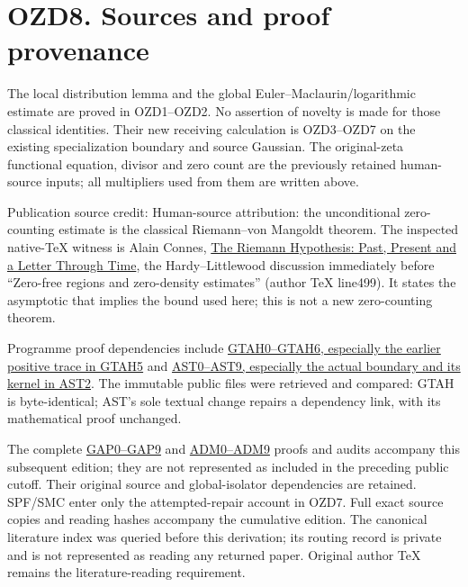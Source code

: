 \section{OZD8. Sources and proof
provenance}\label{ozd8.-sources-and-proof-provenance}

The local distribution lemma and the global Euler--Maclaurin/logarithmic
estimate are proved in OZD1--OZD2. No assertion of novelty is made for
those classical identities. Their new receiving calculation is
OZD3--OZD7 on the existing specialization boundary and source Gaussian.
The original-zeta functional equation, divisor and zero count are the
previously retained human-source inputs; all multipliers used from them
are written above.

Publication source credit: Human-source attribution: the unconditional
zero-counting estimate is the classical Riemann--von Mangoldt theorem.
The inspected native-TeX witness is Alain Connes,
\href{https://arxiv.org/abs/2602.04022v1}{The Riemann Hypothesis: Past,
Present and a Letter Through Time}, the Hardy--Littlewood discussion
immediately before ``Zero-free regions and zero-density estimates''
(author TeX line499). It states the asymptotic that implies the bound
used here; this is not a new zero-counting theorem.

Programme proof dependencies include
\href{https://github.com/KokunoYumeto/zeta-function-research-reader/blob/36a82ecca98addb8a98b48204e349737856c7223/workbenches/splitzero-tandem/continuations/20260924-cohomology-weight-and-character-lifts/geometric-positive-quotient/GEOMETRIC_TRANSFER_POSITIVE_ADJOINT_DEFECT.md}{GTAH0--GTAH6,
especially the earlier positive trace in GTAH5} and
\href{https://github.com/KokunoYumeto/zeta-function-research-reader/blob/36a82ecca98addb8a98b48204e349737856c7223/workbenches/splitzero-tandem/continuations/20260924-cohomology-weight-and-character-lifts/geometric-positive-quotient/ADJOINT_DEFECT_SOURCE_TOPOLOGY_COMPARISON.md}{AST0--AST9,
especially the actual boundary and its kernel in AST2}. The immutable
public files were retrieved and compared: GTAH is byte-identical; AST's
sole textual change repairs a dependency link, with its mathematical
proof unchanged.

The complete
\href{https://github.com/KokunoYumeto/zeta-function-research-reader/blob/main/workbenches/splitzero-tandem/continuations/20260925-full-source-tensor-and-original-divisor/identity/GAUSSIAN_FULL_SOURCE_APPROXIMATION.md}{GAP0--GAP9}
and
\href{https://github.com/KokunoYumeto/zeta-function-research-reader/blob/main/workbenches/splitzero-tandem/continuations/20260925-full-source-tensor-and-original-divisor/identity/ACTUAL_DEFECT_MULTIPLIER_DOMAIN.md}{ADM0--ADM9}
proofs and audits accompany this subsequent edition; they are not
represented as included in the preceding public cutoff. Their original
source and global-isolator dependencies are retained. SPF/SMC enter only
the attempted-repair account in OZD7. Full exact source copies and
reading hashes accompany the cumulative edition. The canonical
literature index was queried before this derivation; its routing record
is private and is not represented as reading any returned paper.
Original author TeX remains the literature-reading requirement.

